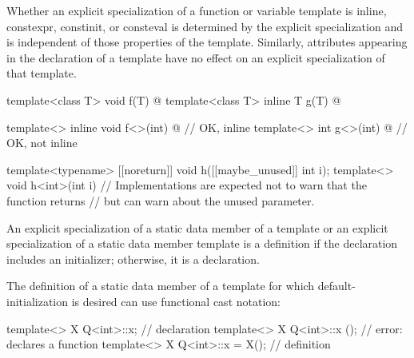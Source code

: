 \pnum
Whether an explicit specialization of a function or variable template
is inline, constexpr, constinit, or consteval
is determined by the explicit specialization and
is independent of those properties of the template.
Similarly,
attributes appearing in the declaration of a template
have no effect on an explicit specialization of that template.
\begin{example}
\begin{codeblock}
template<class T> void f(T) { @\commentellip@ }
template<class T> inline T g(T) { @\commentellip@ }

template<> inline void f<>(int) { @\commentellip@ }   // OK, inline
template<> int g<>(int) { @\commentellip@ }           // OK, not inline

template<typename> [[noreturn]] void h([[maybe_unused]] int i);
template<> void h<int>(int i) {
    // Implementations are expected not to warn that the function returns
    // but can warn about the unused parameter.
}
\end{codeblock}
\end{example}

\pnum
An explicit specialization of a static data member of a template
or an explicit specialization of a static data member template is a
definition if the declaration includes an initializer;
otherwise, it is a declaration.
\begin{note}
The definition of a static data member of a template
for which default-initialization is desired
can use functional cast notation:

\begin{codeblock}
template<> X Q<int>::x;                         // declaration
template<> X Q<int>::x ();                      // error: declares a function
template<> X Q<int>::x = X();                   // definition
\end{codeblock}
\end{note}

